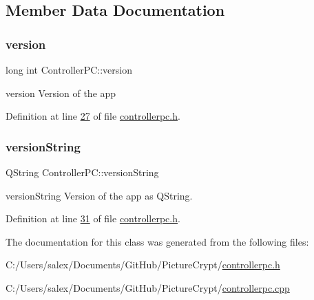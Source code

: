 \subsection{Member Data Documentation}
\mbox{\label{class_controller_p_c_a9eb43c34237d66751a6411e55cf5f55e}} 
\subsubsection{\texorpdfstring{version}{version}}
{\footnotesize\ttfamily long int Controller\+P\+C\+::version}



version Version of the app 



Definition at line \mbox{\hyperlink{controllerpc_8h_source_l00027}{27}} of file \mbox{\hyperlink{controllerpc_8h_source}{controllerpc.\+h}}.

\mbox{\label{class_controller_p_c_a0e63cca37d6ce2e660f3380400c2c5f3}} 
\subsubsection{\texorpdfstring{version\+String}{versionString}}
{\footnotesize\ttfamily Q\+String Controller\+P\+C\+::version\+String}



version\+String Version of the app as Q\+String. 



Definition at line \mbox{\hyperlink{controllerpc_8h_source_l00031}{31}} of file \mbox{\hyperlink{controllerpc_8h_source}{controllerpc.\+h}}.



The documentation for this class was generated from the following files\+:\begin{DoxyCompactItemize}
\item 
C\+:/\+Users/salex/\+Documents/\+Git\+Hub/\+Picture\+Crypt/\mbox{\hyperlink{controllerpc_8h}{controllerpc.\+h}}\item 
C\+:/\+Users/salex/\+Documents/\+Git\+Hub/\+Picture\+Crypt/\mbox{\hyperlink{controllerpc_8cpp}{controllerpc.\+cpp}}\end{DoxyCompactItemize}

